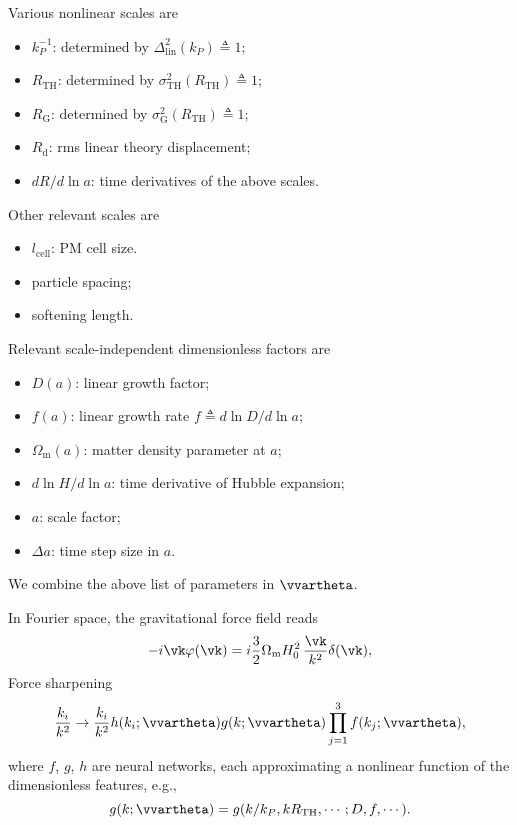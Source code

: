\documentclass[usenatbib]{mnras}
\renewcommand{\d}{d}
\newcommand{\Omegam}{\Omega_\mathrm{m}}
\newcommand{\linear}{\mathrm{lin}}
\newcommand{\tophat}{\mathrm{TH}}
\newcommand{\gauss}{\mathrm{G}}
\begin{document}
Various nonlinear scales are
\begin{itemize}
\item $k_P^{-1}$: determined by $\Delta_\linear^2(k_P) \triangleq 1$;
\item $R_\tophat$: determined by $\sigma_\tophat^2(R_\tophat) \triangleq
  1$;
\item $R_\gauss$: determined by $\sigma_\gauss^2(R_\tophat) \triangleq
  1$;
\item $R_\mathrm{d}$: rms linear theory displacement;
\item $\d R / \d\ln a$: time derivatives of the above scales.
\end{itemize}

Other relevant scales are
\begin{itemize}
\item $l_\mathrm{cell}$: PM cell size.
\item particle spacing;
\item softening length.
\end{itemize}

Relevant scale-independent dimensionless factors are
\begin{itemize}
\item $D(a)$: linear growth factor;
\item $f(a)$: linear growth rate $f \triangleq \d\ln D / \d\ln a$;
\item $\Omegam(a)$: matter density parameter at $a$;
\item $\d\ln H / \d\ln a$: time derivative of Hubble expansion;
\item $a$: scale factor;
\item $\Delta a$: time step size in $a$.
\end{itemize}

We combine the above list of parameters in $\vvartheta$.


In Fourier space, the gravitational force field reads
\begin{equation}
- i \vk \varphi(\vk) = i \frac32 \Omegam H_0^2 \,\frac{\vk}{k^2} \delta(\vk),
\end{equation}
Force sharpening
%
\begin{equation}
\frac{k_i}{k^2} \to \frac{k_i}{k^2}
  h(k_i; \vvartheta) g(k; \vvartheta) \prod_{j=1}^3 f(k_j; \vvartheta),
\end{equation}
%
where $f$, $g$, $h$ are neural networks, each approximating a nonlinear
function of the dimensionless features, e.g.,
%
\begin{equation}
g(k; \vvartheta) = g(k/k_P, kR_\tophat, \cdots; D, f, \cdots).
\end{equation}
\end{document}
